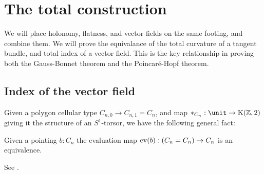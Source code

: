 \section{The total construction}
\label{sec:totals}
We will place holonomy, flatness, and vector fields on the same footing, and combine them. We will prove the equivalance of the total curvature of a tangent bundle, and total index of a vector field. This is the key relationship in proving both the Gauss-Bonnet theorem and the Poincaré-Hopf theorem.

\subsection{Index of the vector field}
Given a polygon cellular type \( C_{n,0}\to C_{n,1}=C_n \), and map \( *_{C_n}:\unit\to\Kzt \) giving it the structure of an \( S^1 \)-torsor, we have the following general fact:
\begin{myprop}
\label{prop:eveq}
Given a pointing \( b:C_n \) the evaluation map \( \mathrm{ev}(b):(C_n=C_n)\to C_n \) is an equivalence.
\end{myprop}
\begin{myproof}
See \cite{buchholtz2023central}.
\end{myproof}

